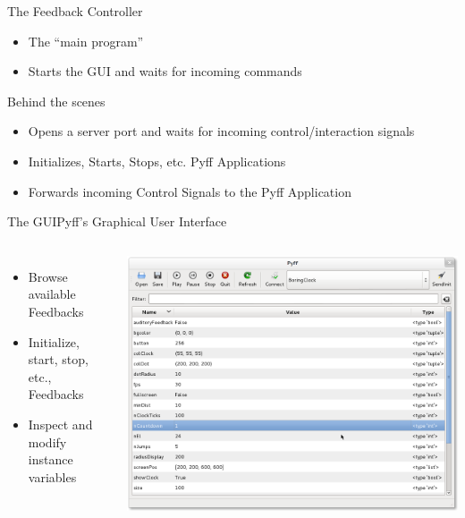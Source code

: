 \documentclass{beamer}
\begin{document}
\begin{frame}{The Feedback Controller}
    \begin{itemize}
        \item The ``main program''
        \item Starts the GUI and waits for incoming commands
    \end{itemize}
    \begin{block}{Behind the scenes}
        \begin{itemize}
            \item Opens a server port and waits for incoming
                control/interaction signals
            \item Initializes, Starts, Stops, etc. Pyff Applications
            \item Forwards incoming Control Signals to the Pyff Application
        \end{itemize}
    \end{block}
\end{frame}

\begin{frame}{The GUI}{Pyff's Graphical User Interface}
    \begin{columns}[T]
            \begin{itemize}
                \item Browse available Feedbacks
                \item Initialize, start, stop, etc., Feedbacks
                \item Inspect and \alert{modify} instance variables
            \end{itemize}
             \includegraphics[width=\textwidth]{gui}
   \end{columns}
\end{frame}
\end{document}

